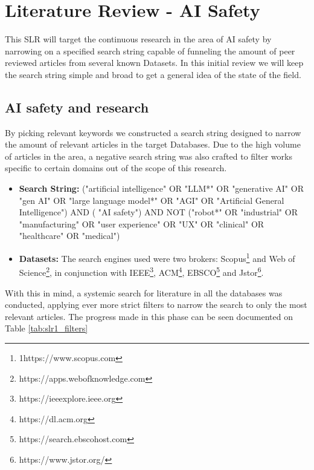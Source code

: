 \chapter{Literature Review - AI Safety}\label{chap:literature_review}

This SLR will target the continuous research in the area of AI safety by narrowing on a specified search string capable of funneling the amount of peer reviewed articles from several known Datasets. In this initial review we will keep the search string simple and broad to get a general idea of the state of the field.

\section{AI safety and research}

By picking relevant keywords we constructed a search string designed to narrow the amount of relevant articles in the target Databases. Due to the high volume of articles in the area, a negative search string was also crafted to filter works specific to certain domains out of the scope of this research.

\begin{itemize}
    \item \textbf{Search String:} ("artificial intelligence" OR "LLM*" OR "generative AI" OR "gen AI" OR "large language model*" OR "AGI" OR "Artificial General Intelligence") AND ( "AI safety") AND NOT ("robot*" OR "industrial" OR "manufacturing" OR "user experience" OR "UX" OR "clinical" OR "healthcare" OR "medical")
    \item \textbf{Datasets:} The search engines used were two brokers: Scopus\footnote{1https://www.scopus.com} and Web of Science\footnote{https://apps.webofknowledge.com}, in conjunction with IEEE\footnote{https://ieeexplore.ieee.org}, ACM\footnote{https://dl.acm.org}, EBSCO\footnote{https://search.ebscohost.com} and Jstor\footnote{https://www.jstor.org/}.
\end{itemize}

With this in mind, a systemic search for literature in all the databases was conducted, applying ever more strict filters to narrow the search to only the most relevant articles. The progress made in this phase can be seen documented on Table \ref{tab:slr1_filters}




